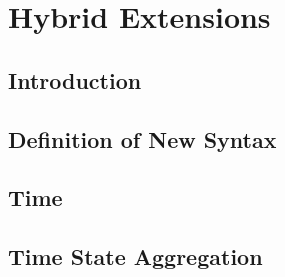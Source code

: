 \chapter{Hybrid Extensions}
\section{Introduction}
\section{Definition of New Syntax}
\section{Time}
\section{Time State Aggregation}